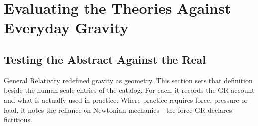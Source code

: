 \documentclass[11pt,a4paper]{article}
\begin{document}
\section{Evaluating the Theories Against Everyday Gravity}

\subsection{Testing the Abstract Against the Real}

General Relativity redefined gravity as geometry. This section sets that definition beside the human-scale entries of the catalog. For each, it records the GR account and what is actually used in practice. Where practice requires force, pressure or load, it notes the reliance on Newtonian mechanics---the force GR declares fictitious.
\end{document}

